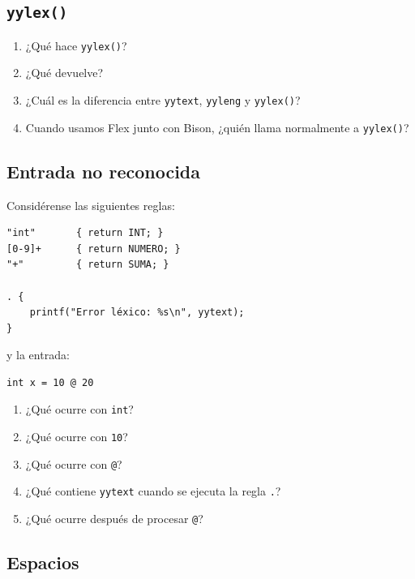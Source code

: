 \documentclass{article}
\begin{document}
\subsection{\texttt{yylex()}}

\begin{enumerate}
    \item ¿Qué hace \texttt{yylex()}?

    \item ¿Qué devuelve?

    \item ¿Cuál es la diferencia entre \texttt{yytext},
    \texttt{yyleng} y \texttt{yylex()}?

    \item Cuando usamos Flex junto con Bison, ¿quién llama normalmente
    a \texttt{yylex()}?
\end{enumerate}

\subsection{Entrada no reconocida}

Considérense las siguientes reglas:

\begin{verbatim}
"int"       { return INT; }
[0-9]+      { return NUMERO; }
"+"         { return SUMA; }

. {
    printf("Error léxico: %s\n", yytext);
}
\end{verbatim}

y la entrada:

\begin{verbatim}
int x = 10 @ 20
\end{verbatim}

\begin{enumerate}
    \item ¿Qué ocurre con \texttt{int}?

    \item ¿Qué ocurre con \texttt{10}?

    \item ¿Qué ocurre con \texttt{@}?

    \item ¿Qué contiene \texttt{yytext} cuando se ejecuta la regla
    \texttt{.}?

    \item ¿Qué ocurre después de procesar \texttt{@}?
\end{enumerate}

\subsection{Espacios}
\end{document}
